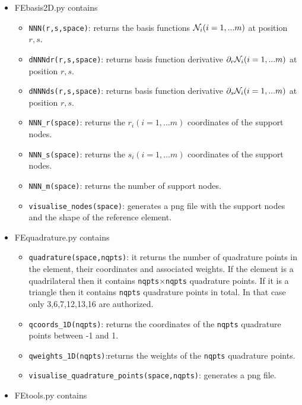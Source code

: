 \begin{itemize}

\item {\pythonfile FEbasis2D.py} contains 

\begin{itemize}
\item \lstinline{NNN(r,s,space)}: returns the basis functions ${\mathcal{N}}_i (i=1,...m)$ at position $r,s$.
\item \lstinline{dNNNdr(r,s,space)}: returns basis function derivative $\partial_r{\mathcal{N}}_i (i=1,...m)$ at position $r,s$.
\item \lstinline{dNNNds(r,s,space)}: returns basis function derivative $\partial_s{\mathcal{N}}_i (i=1,...m)$ at position $r,s$.
\item \lstinline{NNN_r(space)}: returns the $r_i (i=1,...m)$ coordinates of the support nodes.
\item \lstinline{NNN_s(space)}: returns the $s_i (i=1,...m)$ coordinates of the support nodes.
\item \lstinline{NNN_m(space)}: returns the number of support nodes.
\item \lstinline{visualise_nodes(space)}: generates a png file with the support nodes and the shape of the reference element.
\end{itemize}


\item {\pythonfile FEquadrature.py} contains
\begin{itemize}
\item \lstinline{quadrature(space,nqpts)}: it returns the number of quadrature points in the element, 
their coordinates and associated weights. If the element is a quadrilateral then it contains 
\lstinline{nqpts}$\times$\lstinline{nqpts} quadrature points. 
If it is a triangle then it contains \lstinline{nqpts} quadrature points in total. 
In that case only 3,6,7,12,13,16 are authorized.   
\item \lstinline{qcoords_1D(nqpts)}: returns the coordinates of the \lstinline{nqpts} quadrature points between -1 and 1.
\item \lstinline{qweights_1D(nqpts)}:returns the weights of the \lstinline{nqpts} quadrature points.
\item \lstinline{visualise_quadrature_points(space,nqpts)}: generates a png file.
\end{itemize}


\item {\pythonfile FEtools.py} contains


\end{itemize}

